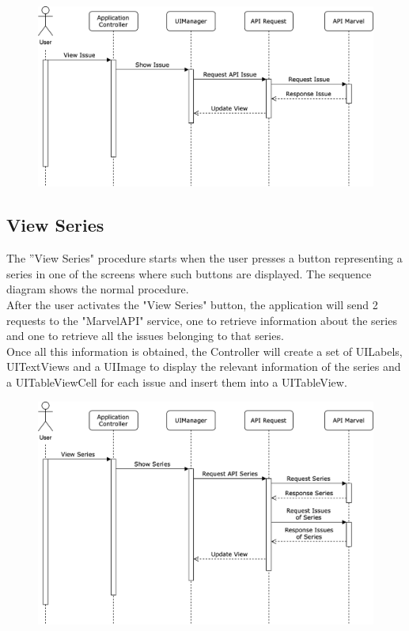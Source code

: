 \vspace{5mm}

\begin{figure}[h]
\centering
\includegraphics[width=\textwidth]{img/seqdiagrams/viewissue}
\end{figure}

\clearpage

\subsection{View Series}
The ”View Series" procedure starts when the user presses a button representing a series in one of the screens where such buttons are displayed. The sequence diagram shows the normal procedure. \\
After the user activates the "View Series" button, the application will send 2 requests to the "MarvelAPI" service, one to retrieve information about the series and one to retrieve all the issues belonging to that series. \\
Once all this information is obtained, the Controller will create a set of UILabels, UITextViews and a UIImage to display the relevant information of the series and a UITableViewCell for each issue and insert them into a UITableView. 

\vspace{5mm}

\begin{figure}[h]
\centering
\includegraphics[width=\textwidth]{img/seqdiagrams/viewseries}
\end{figure}

